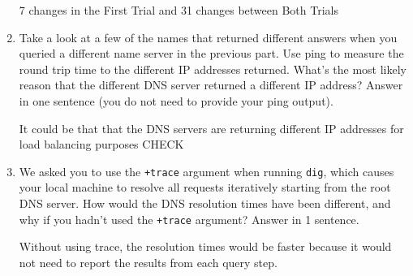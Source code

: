 \documentclass[10pt]{article}
\begin{document}
\begin{enumerate}
7 changes in the First Trial and 31 changes between Both Trials

\item Take a look at a few of the names that returned different answers when you queried a different name server in the previous part. Use ping to measure the round trip time to the different IP addresses returned. What's the most likely reason that the different DNS server returned a different IP address? Answer in one sentence (you do not need to provide your ping output).

It could be that that the DNS servers are returning different IP addresses for load balancing purposes  CHECK

\item We asked you to use the \texttt{+trace} argument when running \texttt{dig}, which causes your local machine to resolve all requests iteratively starting from the root DNS server. How would the DNS resolution times have been different, and why if you hadn't used the \texttt{+trace} argument? Answer in 1 sentence.

Without using trace, the resolution times would be faster because it would not need to report the results from each query step.

\end{enumerate}
\end{document}
